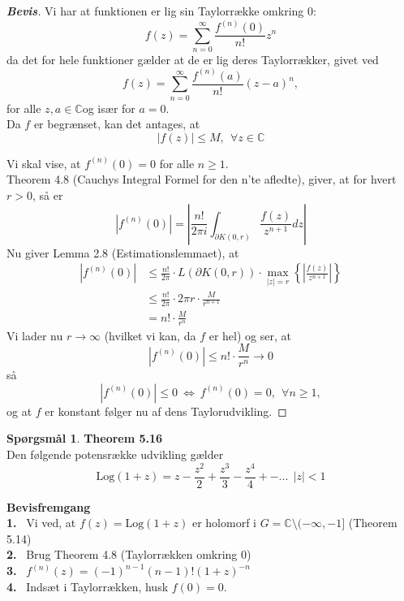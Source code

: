 \documentclass[10pt,a4paper]{article}
\theoremstyle{definition}
\newtheorem{Prob}{Spørgsmål}
\begin{document}
\newpage
\begin{proof}[\textbf{Bevis}] 
Vi har at funktionen er lig sin Taylorrække omkring $0$:
$$f(z) = \sum_{n=0}^\infty \frac{f^{(n)}(0)}{n!}z^n$$
da det for hele funktioner gælder at de er lig deres Taylorrækker, givet ved 
$$f(z)= \sum\limits_{n=0}^\infty \frac{f^{(n)}(a)}{n!} (z-a)^n,$$ 
for alle $z,a \in \mathbb{C}$og især for $a=0$. \\

Da $f$ er begrænset, kan det antages, at
$$|f(z)| \leq M, \ \ \forall z \in \mathbb{C}$$

Vi skal vise, at $f^{(n)}(0) = 0$ for alle $n \geq 1$. \\
Theorem 4.8 (Cauchys Integral Formel for den n'te afledte), giver, at for hvert $r>0$, så er
$$|f^{(n)}(0)| = \left| \frac{n!}{2 \pi i} \int_{\partial K(0,r)} \frac{f(z)}{z^{n+1}}dz \right|$$
Nu giver Lemma 2.8 (Estimationslemmaet), at
\begin{align*}
|f^{(n)}(0)| &\leq \frac{n!}{2 \pi}  \cdot L(\partial K(0,r))  \cdot \max_{|z|=r} \left\{ \left| \frac{f(z)}{z^{n+1}} \right| \right\} \\
&\leq \frac{n!}{2 \pi}  \cdot 2 \pi r \cdot \frac{M}{r^{n+1}}  \\
&= n! \cdot \frac{M}{r^n}
\end{align*}
Vi lader nu $r \rightarrow \infty$ (hvilket vi kan, da $f$ er hel) og ser, at
$$|f^{(n)}(0)| \leq  n! \cdot \frac{M}{r^n} \rightarrow 0$$
så
$$|f^{(n)}(0)| \leq 0  \ \Leftrightarrow \ f^{(n)}(0) = 0, \ \ \forall n \geq 1,$$
og at $f$ er konstant følger nu af dens Taylorudvikling.
\end{proof}








\newpage
\begin{Prob}{\textbf{Theorem 5.16}} \\

Den følgende potensrække udvikling gælder
$$\text{Log}(1+z) = z - \frac{z^2}{2} + \frac{z^3}{3} - \frac{z^4}{4} + - ...  \ \ |z|<1$$
\end{Prob}

\begin{framed}
\textbf{Bevisfremgang} \\
\textbf{1.} \ Vi ved, at $f(z) = \text{Log}(1+z)$ er holomorf i $G = \mathbb{C} \setminus (-\infty,-1]$ (Theorem 5.14)\\
\textbf{2.} \ Brug Theorem 4.8 (Taylorrækken omkring $0$) \\
\textbf{3.} \ $f^{(n)}(z)= (-1)^{n-1} (n-1)! (1+z)^{-n}$ \\
\textbf{4.} \ Indsæt i Taylorrækken, husk $f(0)=0$.
\end{framed}
\end{document}
